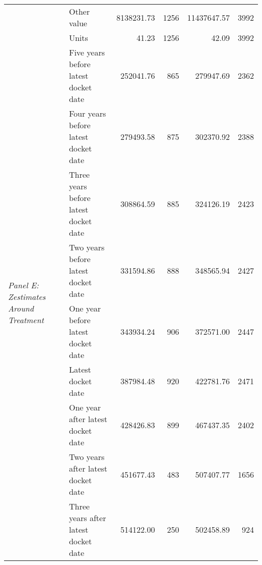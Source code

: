 \begin{tabular}{llrrrr}
 & Other value & 8138231.73 & 1256 & 11437647.57 & 3992 \\
 & Units & 41.23 & 1256 & 42.09 & 3992 \\
\cline{1-6}
\multirow[c]{9}{4cm}{\textit{Panel E: Zestimates Around Treatment}} & Five years before latest docket date & 252041.76 & 865 & 279947.69 & 2362 \\
 & Four years before latest docket date & 279493.58 & 875 & 302370.92 & 2388 \\
 & Three years before latest docket date & 308864.59 & 885 & 324126.19 & 2423 \\
 & Two years before latest docket date & 331594.86 & 888 & 348565.94 & 2427 \\
 & One year before latest docket date & 343934.24 & 906 & 372571.00 & 2447 \\
 & Latest docket date & 387984.48 & 920 & 422781.76 & 2471 \\
 & One year after latest docket date & 428426.83 & 899 & 467437.35 & 2402 \\
 & Two years after latest docket date & 451677.43 & 483 & 507407.77 & 1656 \\
 & Three years after latest docket date & 514122.00 & 250 & 502458.89 & 924 \\
\cline{1-6}
\bottomrule
\end{tabular}
